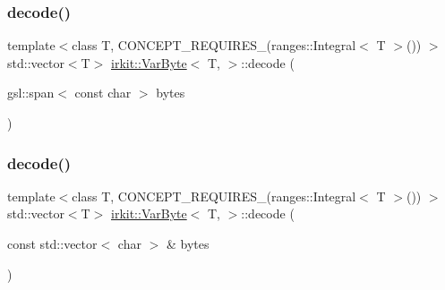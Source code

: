 \subsubsection{\texorpdfstring{decode()}{decode()}\hspace{0.1cm}{\footnotesize\ttfamily [2/3]}}
{\footnotesize\ttfamily template$<$class T, C\+O\+N\+C\+E\+P\+T\+\_\+\+R\+E\+Q\+U\+I\+R\+E\+S\+\_\+(ranges\+::\+Integral$<$ T $>$()) $>$ \\
std\+::vector$<$T$>$ \mbox{\hyperlink{structirkit_1_1VarByte}{irkit\+::\+Var\+Byte}}$<$ T, $>$\+::decode (\begin{DoxyParamCaption}\item[{gsl\+::span$<$ const char $>$}]{bytes }\end{DoxyParamCaption})\hspace{0.3cm}{\ttfamily [inline]}}

\mbox{\label{structirkit_1_1VarByte_af3b00fc21d45e56ce87ccc06626e55c5}} 
\subsubsection{\texorpdfstring{decode()}{decode()}\hspace{0.1cm}{\footnotesize\ttfamily [3/3]}}
{\footnotesize\ttfamily template$<$class T, C\+O\+N\+C\+E\+P\+T\+\_\+\+R\+E\+Q\+U\+I\+R\+E\+S\+\_\+(ranges\+::\+Integral$<$ T $>$()) $>$ \\
std\+::vector$<$T$>$ \mbox{\hyperlink{structirkit_1_1VarByte}{irkit\+::\+Var\+Byte}}$<$ T, $>$\+::decode (\begin{DoxyParamCaption}\item[{const std\+::vector$<$ char $>$ \&}]{bytes }\end{DoxyParamCaption})\hspace{0.3cm}{\ttfamily [inline]}}

\mbox{\label{structirkit_1_1VarByte_aa9ef5e1ad8ef7e604d2b49108b7c0b06}} 
